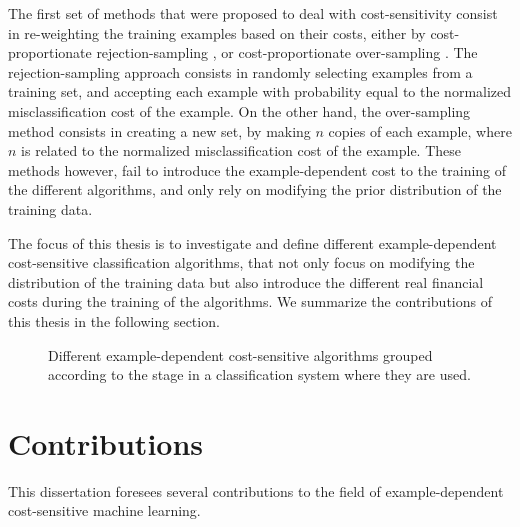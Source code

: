   The first set of methods that were proposed to deal with cost-sensitivity consist in 
  re-weighting the training examples based on their costs, either by cost-proportionate 
  rejection-sampling \citep{Zadrozny2003}, or cost-proportionate over-sampling \citep{Elkan2001}.
  The rejection-sampling approach consists in randomly selecting examples from a training set, and 
  accepting each example with probability equal to the normalized misclassification cost of the 
  example. On the other hand, the over-sampling method consists in creating a new set, by making 
  $n$ copies of each example, where $n$ is related to the normalized misclassification cost of the 
  example. These methods however, fail to introduce the example-dependent cost to the training of 
  the different algorithms, and only rely on modifying the prior distribution of the training data.

  The focus of this thesis is to investigate and define different example-dependent cost-sensitive
  classification algorithms, that not only focus on modifying the distribution of the training data
  but also introduce the different real financial costs during the training of the 
  algorithms. We summarize the contributions of this thesis in the following section.
  
  \begin{figure}
  \centering
  
  \caption{Different example-dependent cost-sensitive algorithms grouped according to the 
    stage in a classification system where they are used.}
  \label{fig:1:1}
  \end{figure}
  
\section{Contributions}

This dissertation foresees several contributions to the field of example-dependent 
cost-sensitive machine learning.
  
